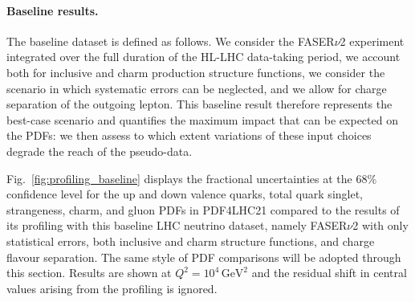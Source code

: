 \paragraph{Baseline results.}
%
The baseline dataset is defined as follows.
%
We consider the FASER$\nu$2 experiment integrated over the full duration of the HL-LHC data-taking period,
we account both for inclusive and charm production structure functions, we consider the scenario
in which systematic errors can be neglected, and we allow for charge separation of the outgoing lepton.
%
This baseline result therefore represents the best-case scenario and quantifies the maximum impact that can be expected
on the PDFs: we then assess to which extent variations of these input choices degrade the reach of the pseudo-data.

Fig.~\ref{fig:profiling_baseline} displays the fractional uncertainties at the 68\% confidence level
for the up and down valence quarks, total quark singlet, strangeness, charm, and gluon PDFs
in PDF4LHC21 compared to the results of its profiling with this baseline LHC neutrino dataset, namely
FASER$\nu$2 with only statistical errors, both inclusive and charm structure functions,  and charge flavour
separation.
%
The same style of PDF comparisons will be adopted through this section.
%
Results are shown at $Q^2 = 10^4 \, \textrm{GeV}^2$ and the residual shift in central values
arising from the profiling is ignored.


